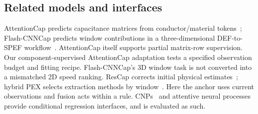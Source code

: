 \documentclass[conference,9pt,letterpaper]{IEEEtran}
\begin{document}
\subsection{Related models and interfaces}
AttentionCap predicts capacitance matrices from conductor/material tokens~\cite{attentioncap}; Flash-CNNCap predicts window contributions in a three-dimensional DEF-to-SPEF workflow~\cite{flash}.
AttentionCap itself supports partial matrix-row supervision. Our component-supervised AttentionCap adaptation tests a specified observation budget and fitting recipe.
Flash-CNNCap's 3D window task is not converted into a mismatched 2D speed ranking.
ResCap corrects initial physical estimates~\cite{rescap}; hybrid PEX selects extraction methods by window~\cite{hybrid}. Here the anchor uses current observations and fusion acts within a rule. CNPs~\cite{cnp} and attentive neural processes~\cite{anp} provide conditional regression interfaces, and is evaluated as such.


\end{document}
